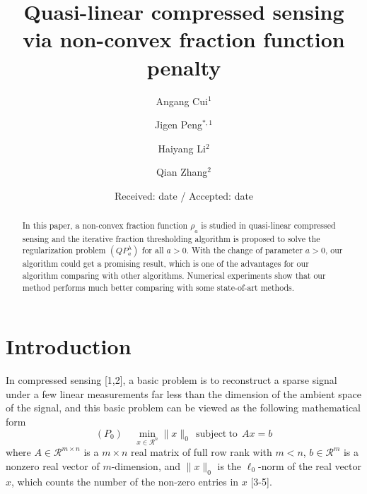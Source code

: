 \documentclass[smallextended]{svjour3}
\begin{document}
\title{Quasi-linear compressed sensing via non-convex fraction function penalty}


\author{Angang Cui$^{1}$ \and
        Jigen Peng$^{\ast,1}$ \and
        Haiyang Li$^{2}$ \and
        Qian Zhang$^{2}$
        
}



\date{Received: date / Accepted: date}


\maketitle

\begin{abstract}
In this paper, a non-convex fraction function $\rho_{a}$ is studied in quasi-linear compressed sensing and the iterative fraction thresholding algorithm
is proposed to solve the regularization problem $(QP_{a}^{\lambda})$ for all $a>0$. With the change of parameter $a>0$, our algorithm could get a
promising result, which is one of the advantages for our algorithm comparing with other algorithms. Numerical experiments show that our method
performs much better comparing with some state-of-art methods.
\end{abstract}

\section{Introduction}\label{intro}
In compressed sensing [1,2], a basic problem is to reconstruct a sparse signal under a few linear measurements far less than the
dimension of the ambient space of the signal, and this basic problem can be viewed as the following mathematical form
\begin{equation}\label{r1}
(P_{0})\ \ \ \ \ \min_{x\in \mathcal{R}^{n}}\|x\|_{0}\ \ \mathrm{subject}\ \mathrm{to}\ \ Ax=b
\end{equation}
where $A\in \mathcal{R}^{m\times n}$ is a $m\times n$ real matrix of full row rank with $m<n$, $b\in \mathcal{R}^{m}$ is
a nonzero real vector of $m$-dimension, and $\|x\|_{0}$ is the $\ell_{0}$-norm of the real vector $x$, which counts
the number of the non-zero entries in $x$ [3-5].
\end{document}
